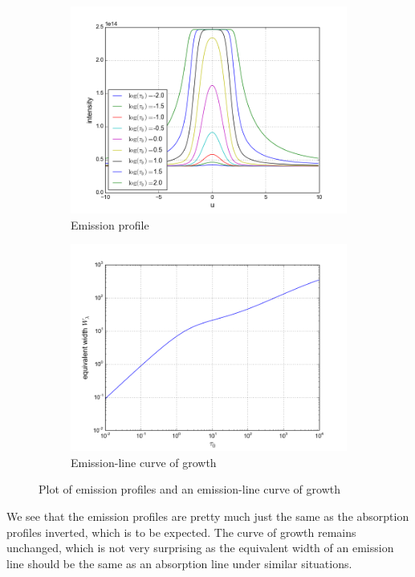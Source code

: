 \documentclass{article}
\begin{document}
\begin{figure}[H]
  \centering
  \begin{subfigure}[b]{0.49\textwidth}
    \includegraphics[width=\textwidth]{ssa_3_5_1.png}
    \caption{Emission profile}
  \end{subfigure}
  \begin{subfigure}[b]{0.49\textwidth}
    \includegraphics[width=\textwidth]{ssa_3_5_2.png}
    \caption{Emission-line curve of growth}
  \end{subfigure}
  \caption{Plot of emission profiles and an emission-line curve of growth}
\end{figure}
We see that the emission profiles are pretty much just the same as the absorption profiles inverted, which is to be expected. The curve of growth remains unchanged, which is not very surprising as the equivalent width of an emission line should be the same as an absorption line under similar situations.
\end{document}
